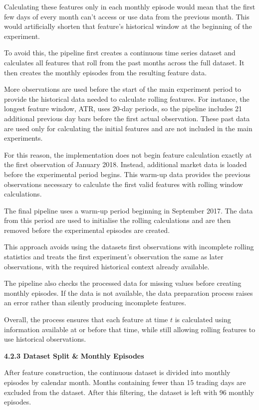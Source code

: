 Calculating these features only in each monthly episode would mean that
the first few days of every month can't access or use data from the
previous month. This would artificially shorten that feature's
historical window at the beginning of the experiment.

To avoid this, the pipeline first creates a continuous time series
dataset and calculates all features that roll from the past months
across the full dataset. It then creates the monthly episodes from the
resulting feature data.

More observations are used before the start of the main experiment
period to provide the historical data needed to calculate rolling
features. For instance, the longest feature window, ATR, uses 20-day
periods, so the pipeline includes 21 additional previous day bars before
the first actual observation. These past data are used only for
calculating the initial features and are not included in the main
experiments.

For this reason, the implementation does not begin feature calculation
exactly at the first observation of January 2018. Instead, additional
market data is loaded before the experimental period begins. This
warm-up data provides the previous observations necessary to calculate
the first valid features with rolling window calculations.

The final pipeline uses a warm-up period beginning in September 2017.
The data from this period are used to initialise the rolling
calculations and are then removed before the experimental episodes are
created.

This approach avoids using the dataset\textquotesingle s first
observations with incomplete rolling statistics and treats the first
experiment's observation the same as later observations, with the
required historical context already available.

The pipeline also checks the processed data for missing values before
creating monthly episodes. If the data is not available, the data
preparation process raises an error rather than silently producing
incomplete features.

Overall, the process ensures that each feature at time \(t\) is
calculated using information available at or before that time, while
still allowing rolling features to use historical observations.

\textbf{4.2.3 Dataset Split \&} \textbf{Monthly Episodes}

After feature construction, the continuous dataset is divided into
monthly episodes by calendar month. Months containing fewer than 15
trading days are excluded from the dataset. After this filtering, the
dataset is left with 96 monthly episodes.

